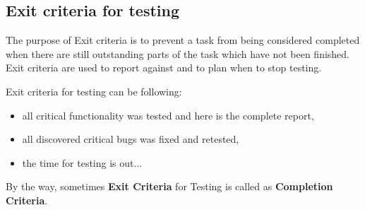 \subsection{Exit criteria for testing}
\label{sec:Exit criteria for testing}

 The purpose of Exit criteria is to prevent a task from being considered completed when there are still outstanding parts of the task which have not been finished. Exit criteria are used to report against and to plan when to stop testing. 

Exit criteria for testing can be following:

    \begin{itemize}
\item     all critical functionality was tested and here is the complete report,
\item     all discovered critical bugs was fixed and retested,
\item     the time for testing is out...\end{itemize}

By the way, sometimes \textbf{Exit Criteria} for Testing is called as \textbf{Completion Criteria}.